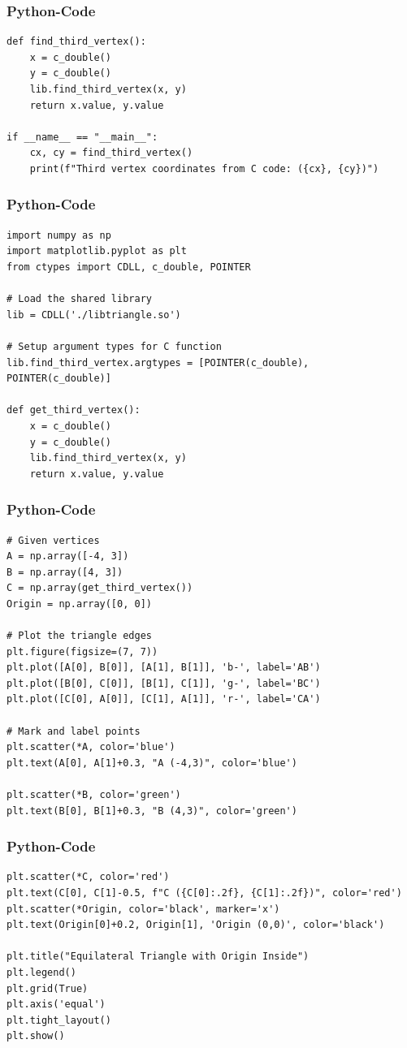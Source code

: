 \documentclass{beamer}
\begin{document}
\begin{frame}[fragile]
\frametitle{Python-Code}
\begin{lstlisting}
def find_third_vertex():
    x = c_double()
    y = c_double()
    lib.find_third_vertex(x, y)
    return x.value, y.value

if __name__ == "__main__":
    cx, cy = find_third_vertex()
    print(f"Third vertex coordinates from C code: ({cx}, {cy})")
\end{lstlisting}
\end{frame}

\begin{frame}[fragile]
\frametitle{Python-Code}
\begin{lstlisting}
import numpy as np
import matplotlib.pyplot as plt
from ctypes import CDLL, c_double, POINTER

# Load the shared library
lib = CDLL('./libtriangle.so')

# Setup argument types for C function
lib.find_third_vertex.argtypes = [POINTER(c_double), POINTER(c_double)]

def get_third_vertex():
    x = c_double()
    y = c_double()
    lib.find_third_vertex(x, y)
    return x.value, y.value
\end{lstlisting}
\end{frame}

\begin{frame}[fragile]
\frametitle{Python-Code}
\begin{lstlisting}
# Given vertices
A = np.array([-4, 3])
B = np.array([4, 3])
C = np.array(get_third_vertex())
Origin = np.array([0, 0])

# Plot the triangle edges
plt.figure(figsize=(7, 7))
plt.plot([A[0], B[0]], [A[1], B[1]], 'b-', label='AB')
plt.plot([B[0], C[0]], [B[1], C[1]], 'g-', label='BC')
plt.plot([C[0], A[0]], [C[1], A[1]], 'r-', label='CA')

# Mark and label points
plt.scatter(*A, color='blue')
plt.text(A[0], A[1]+0.3, "A (-4,3)", color='blue')

plt.scatter(*B, color='green')
plt.text(B[0], B[1]+0.3, "B (4,3)", color='green')
\end{lstlisting}
\end{frame}

\begin{frame}[fragile]
\frametitle{Python-Code}
\begin{lstlisting}
plt.scatter(*C, color='red')
plt.text(C[0], C[1]-0.5, f"C ({C[0]:.2f}, {C[1]:.2f})", color='red')
plt.scatter(*Origin, color='black', marker='x')
plt.text(Origin[0]+0.2, Origin[1], 'Origin (0,0)', color='black')

plt.title("Equilateral Triangle with Origin Inside")
plt.legend()
plt.grid(True)
plt.axis('equal')
plt.tight_layout()
plt.show()
\end{lstlisting}
\end{frame}
\end{document}
